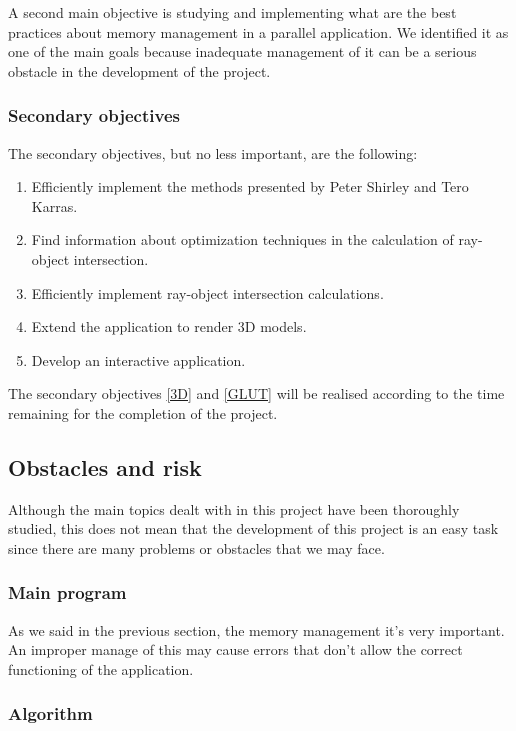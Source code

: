 \documentclass[titlepage,12pt]{report}
\begin{document}
A second main objective is studying and implementing what are the best practices about memory management in a parallel application. We identified it as one of the main goals because inadequate management of it can be a serious obstacle in the development of the project.

\subsubsection{Secondary objectives}

The secondary objectives, but no less important, are the following:

\begin{enumerate}
	\item Efficiently implement the methods presented by Peter Shirley and Tero Karras.
	\item Find information about optimization techniques in the calculation of ray-object intersection.
	\item Efficiently implement ray-object intersection calculations.
	\item \label{3D} Extend the application to render 3D models.
	\item \label{GLUT} Develop an interactive application.
\end{enumerate}

The secondary objectives \ref{3D} and \ref{GLUT} will be realised according to the time remaining for the completion of the project.

\subsection{Obstacles and risk}

Although the main topics dealt with in this project have been thoroughly studied, this does not mean that the development of this project is an easy task since there are many problems or obstacles that we may face.

\subsubsection{Main program}

As we said in the previous section, the memory management it's very important. An improper manage of this may cause errors that don't allow the correct functioning of the application.

\subsubsection{Algorithm}
\end{document}
